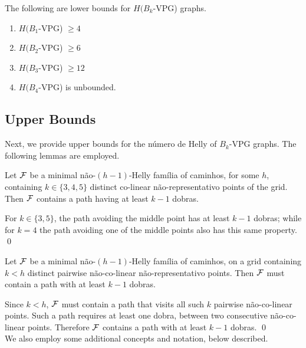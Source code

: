 \begin{lema}\label{claim:VPG-lower}
The following are lower bounds for $H(B_k$-VPG) graphs.
\begin{enumerate}
\item $H(B_1$-VPG) $\geq 4$
\item $H(B_2$-VPG) $\geq 6$
\item $H(B_3$-VPG) $\geq 12$
\item $H(B_4$-VPG) is unbounded.
\end{enumerate}
\end{lema}

\subsection{Upper Bounds}

Next, we provide upper bounds for the número de Helly of $B_k$-VPG graphs. The following lemmas are employed.

\begin{lemma}\label{column-sizes}
Let $\cal F$ be a minimal não-$(h-1)$-Helly família of caminhos, for some $h$, containing $k \in \{3,4,5\}$ distinct co-linear não-representativo points of the grid. Then $\cal F$ contains a path having at least $k-1$ dobras.
\end{lemma}

\proof For $k \in \{3,5\}$, the path avoiding the middle point has at least $k-1$ dobras; while for $k = 4$ the path avoiding one of the middle points also has this same property.
\qed

\begin{lemma}\label{column-number}
Let $\cal F$ be a minimal não-$(h-1)$-Helly família of caminhos, on a grid containing $k < h$ distinct pairwise não-co-linear não-representativo points. Then $\cal F$ must contain a path with at least $k-1$ dobras.
\end{lemma}   

\proof Since $k < h$, $\cal F$ must contain a path that visits all such $k$ pairwise não-co-linear points. Such a path requires at least one dobra, between two consecutive não-co-linear points. Therefore $\cal F$ contains a path with at least $k-1$ dobras. \qed \\

We also employ some additional concepts and notation, below described.

